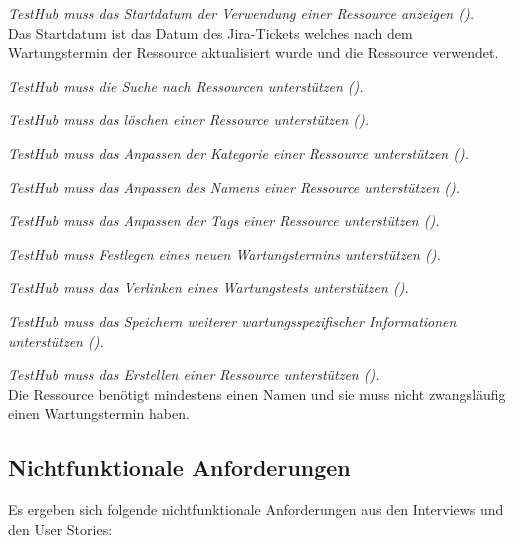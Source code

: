 \begin{description}
    \textit{TestHub muss das Startdatum der Verwendung einer Ressource anzeigen ().}\\
    Das Startdatum ist das Datum des Jira-Tickets welches nach dem Wartungstermin 
    der Ressource aktualisiert wurde und die Ressource verwendet.

    \textit{TestHub muss die Suche nach Ressourcen unterstützen ().}
    
    \textit{TestHub muss das löschen einer Ressource unterstützen ().}
       
    \textit{TestHub muss das Anpassen der Kategorie einer Ressource unterstützen 
    ().}

    \textit{TestHub muss das Anpassen des Namens einer Ressource unterstützen 
    ().}

    \textit{TestHub muss das Anpassen der Tags einer Ressource unterstützen 
    ().}

    \textit{TestHub muss Festlegen eines neuen Wartungstermins unterstützen 
    ().}

    \textit{TestHub muss das Verlinken eines Wartungstests unterstützen 
    ().}

    \textit{TestHub muss das Speichern weiterer wartungsspezifischer Informationen unterstützen 
    ().}

    \textit{TestHub muss das Erstellen einer Ressource unterstützen 
    ().}\\
    Die Ressource benötigt mindestens einen Namen und sie muss nicht zwangsläufig 
    einen Wartungstermin haben.

\end{description}

\subsection{Nichtfunktionale Anforderungen}\label{sec:nfas}
Es ergeben sich folgende nichtfunktionale Anforderungen aus den Interviews und 
den User Stories:

